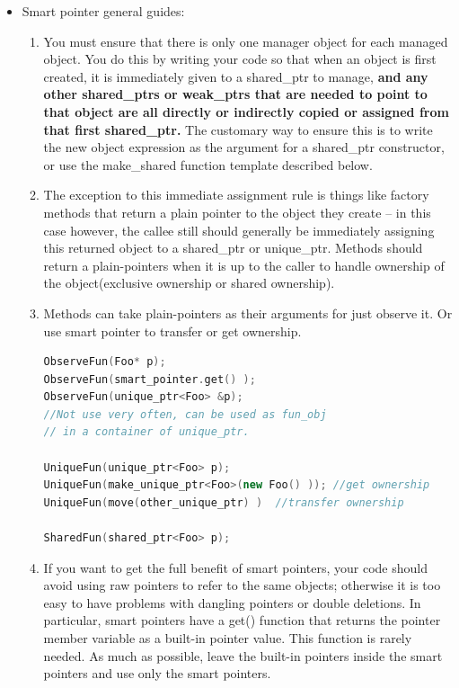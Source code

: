 \documentclass[a4paper,12pt,twoside]{book}
\begin{document}
\begin{itemize}

\item Smart pointer general guides:

\begin{enumerate}

\item You must ensure that there is only one manager object for each managed object. You do this by writing your code so that when an object is first created, it is immediately given to a shared\_ptr to manage, \textbf{and any other shared\_ptrs or weak\_ptrs that are needed to point to that object are all directly or indirectly copied or assigned from that first shared\_ptr.} The customary way to ensure this is to write the new object expression as the argument for a shared\_ptr constructor, or use the make\_shared function template described below.

\item The exception to this immediate assignment rule is things like factory methods that return a plain pointer to the object they create -- in this case however, the callee still should generally be immediately assigning this returned object to a shared\_ptr or unique\_ptr.  Methods should return a plain-pointers when it is up to the caller to handle ownership of the object(exclusive ownership or shared ownership).

\item Methods can take plain-pointers as their arguments for just observe it. Or use smart pointer to transfer or get ownership.
\begin{lstlisting}[frame=single, language=c++]
ObserveFun(Foo* p);
ObserveFun(smart_pointer.get() );
ObserveFun(unique_ptr<Foo> &p);
//Not use very often, can be used as fun_obj
// in a container of unique_ptr.

UniqueFun(unique_ptr<Foo> p);
UniqueFun(make_unique_ptr<Foo>(new Foo() )); //get ownership
UniqueFun(move(other_unique_ptr) )  //transfer ownership

SharedFun(shared_ptr<Foo> p);
\end{lstlisting}

\item If you want to get the full benefit of smart pointers, your code should avoid using raw pointers to refer to the same objects; otherwise it is too easy to have problems with dangling pointers or double
deletions. In particular, smart pointers have a get() function that returns the pointer member variable
as a built-in pointer value. This function is rarely needed. As much as possible, leave the built-in
pointers inside the smart pointers and use only the smart pointers.


\end{enumerate}
\end{itemize}
\end{document}
